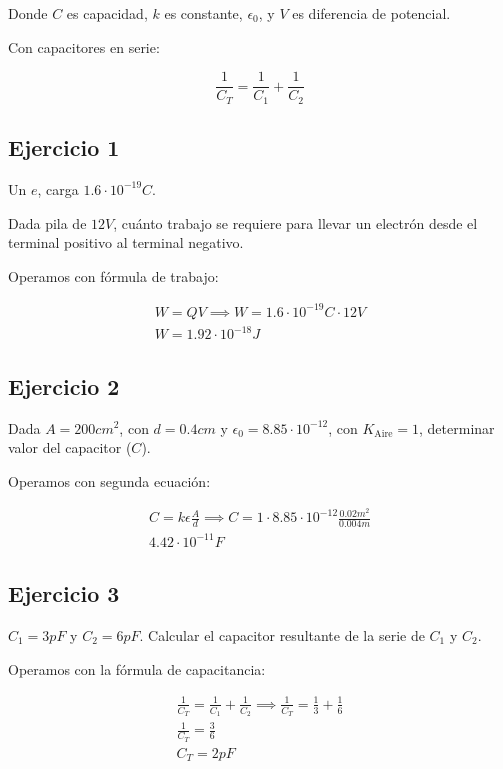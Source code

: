 Donde \(C\) es capacidad,
\(k\) es constante,
\(\epsilon_0\),
y \(V\) es diferencia de potencial.

Con capacitores en serie:

\begin{equation}
    \frac{1}{C_T} = \frac{1}{C_1} + \frac{1}{C_2}
\end{equation}

\subsection{Ejercicio 1}

Un \(e\), carga \(1.6 \cdot 10^{-19}C\).

Dada pila de \(12 V\),
cuánto trabajo se requiere para llevar un electrón desde el terminal positivo al terminal negativo.

Operamos con fórmula de trabajo:

\begin{align*}
    W = QV \implies W = 1.6 \cdot 10^{-19}C \cdot 12 V \\
    \boxed{W = 1.92 \cdot 10^{-18} J}
\end{align*}

\subsection{Ejercicio 2}

Dada \(A = 200 cm^2\), con \(d = 0.4 cm\) y \(\epsilon_0 = 8.85\cdot10^{-12}\),
con \(K_{\text{Aire}} = 1\), determinar valor del capacitor (\(C\)).

Operamos con segunda ecuación:

\begin{align*}
    C=k\epsilon\frac{A}{d} \implies C = 1 \cdot 8.85\cdot10^{-12} \frac{0.02 m^2}{0.004 m} \\
    \boxed{4.42 \cdot 10^{-11} F}
\end{align*}

\subsection{Ejercicio 3}

\(C_1 = 3 pF\) y \(C_2 = 6 pF\). Calcular el capacitor resultante de la serie de \(C_1\) y \(C_2\).

Operamos con la fórmula de capacitancia:

\begin{align*}
    \frac{1}{C_T} = \frac{1}{C_1} + \frac{1}{C_2} \implies \frac{1}{C_T} = \frac{1}{3} + \frac{1}{6} \\
    \frac{1}{C_T} = \frac{3}{6} \\
    \boxed{C_T = 2pF} \\
\end{align*}